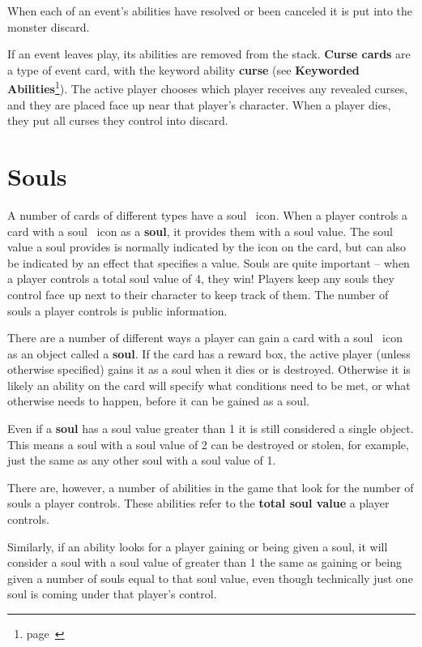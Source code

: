 \documentclass[
  fontsize=10pt,
  paper=a5,
  version=last,
  chapterprefix=true,
  bindingoffset=5mm,
  ]{scrbook}
\newcommand*{\inlineicon}[1]{%
    \raisebox{-.3\baselineskip}{%
        \smash{%
            \texttt{[image: \#1]}%
        }%
    }%
}
\newcommand{\soul}{\inlineicon{./assets/ms-soul.png}}
\begin{document}
    When each of an event’s abilities have resolved or been canceled it is put into the monster discard.

    If an event leaves play, its abilities are removed from the stack.
    \textbf{Curse cards} are a type of event card, with the keyword ability \textbf{curse} (see \textbf{Keyworded Abilities}\footnote{page~\pageref{keyworded}}). The active player chooses which player receives any revealed curses, and they are placed face up near that player’s character. When a player dies, they put all curses they control into discard.

    \section{Souls}
    A number of cards of different types have a soul\soul\ icon. When a player controls a card with a soul\soul\ icon as a \textbf{soul}, it provides them with a soul value. The soul value a soul provides is normally indicated by the icon on the card, but can also be indicated by an effect that specifies a value. Souls are quite important – when a player controls a total soul value of 4, they win! Players keep any souls they control face up next to their character to keep track of them. The number of souls a player controls is public information.

    There are a number of different ways a player can gain a card with a soul\soul\ icon as an object called a \textbf{soul}. If the card has a reward box, the active player (unless otherwise specified) gains it as a soul when it dies or is destroyed. Otherwise it is likely an ability on the card will specify what conditions need to be met, or what otherwise needs to happen, before it can be gained as a soul.

    Even if a \textbf{soul} has a soul value greater than 1 it is still considered a single object. This means a soul with a soul value of 2 can be destroyed or stolen, for example, just the same as any other soul with a soul value of 1.

    There are, however, a number of abilities in the game that look for the number of souls a player controls. These abilities refer to the \textbf{total soul value} a player controls.

    Similarly, if an ability looks for a player gaining or being given a soul, it will consider a soul with a soul value of greater than 1 the same as gaining or being given a number of souls equal to that soul value, even though technically just one soul is coming under that player’s control.
\end{document}
